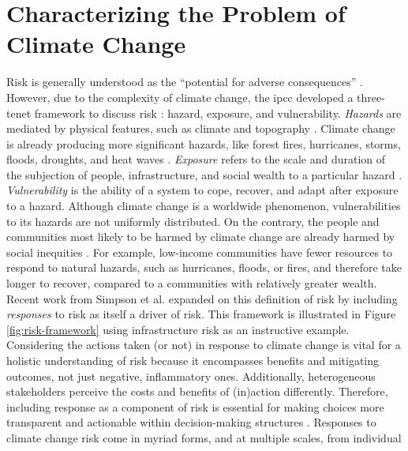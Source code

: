 \section{Characterizing the Problem of Climate Change}
\label{section:climate-change-risk}

Risk is generally understood as the ``potential for adverse consequences''
\cite{reisinger_concept_2020}. However, due to the complexity of climate change,
the \ac{ipcc} developed a three-tenet framework to discuss risk
\cite{reisinger_concept_2020}: hazard, exposure, and vulnerability.
\textit{Hazards} are mediated by physical features, such as climate and
topography \cite{dorkenoo_critical_2022,simpson_framework_2021}.  Climate change
is already producing more significant hazards, like forest fires, hurricanes,
storms, floods, droughts, and heat waves
\cite{reidmiller_fourth_2018,intergovernmental_panel_on_climate_change_climate_2021,dahl_killer_2019}.
\textit{Exposure} refers to the scale and duration of the subjection of people,
infrastructure, and social wealth to a particular hazard
\cite{simpson_framework_2021,reisinger_concept_2020,li_understanding_2021}.
\textit{Vulnerability} is the ability of a system to cope, recover, and adapt
after exposure to a hazard. Although climate change is a worldwide phenomenon,
vulnerabilities to its hazards are not uniformly distributed. On the contrary,
the people and communities most likely to be harmed by climate change are
already harmed by social inequities \cite{islam_climate_2017}. For example,
low-income communities have fewer resources to respond to natural hazards, such
as hurricanes, floods, or fires, and therefore take longer to recover, compared
to a communities with relatively greater wealth. Recent work from Simpson et al.
\cite{simpson_framework_2021} expanded on this definition of risk by including
\textit{responses} to risk as itself a driver of risk. This framework is
illustrated in Figure \ref{fig:risk-framework} using infrastructure risk as an
instructive example. Considering the actions taken (or not) in response to
climate change is vital for a holistic understanding of risk because it
encompasses benefits and mitigating outcomes, not just negative, inflammatory
ones. Additionally, heterogeneous stakeholders perceive the costs and benefits
of (in)action differently. Therefore, including response as a component of risk
is essential for making choices more transparent and actionable within
decision-making structures \cite{simpson_framework_2021}. Responses to climate
change risk come in myriad forms,  and at multiple scales, from individual
